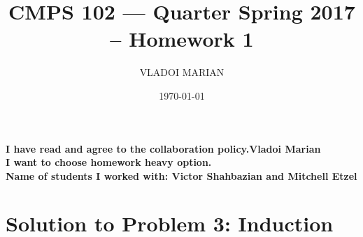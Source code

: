 \documentclass[11pt]{article}
\title{ CMPS 102 --- Quarter  Spring 2017 --  Homework 1}
\author{VLADOI MARIAN}
\date{\today}
\begin{document}
\maketitle


\begin{center}
{\bf I have read and agree to the collaboration policy.Vladoi Marian}\\
{\bf I want to choose homework heavy option.}\\
{\bf Name of students I worked with: Victor Shahbazian and Mitchell Etzel }
\end{center}


\section*{Solution to Problem 3: Induction}
\end{document}
